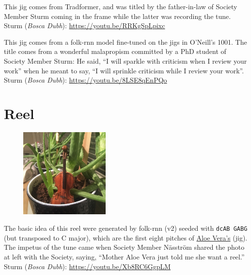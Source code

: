\documentclass[a4paper,notitlepage,twoside]{book}
\begin{document}
{}
\hypertarget{jig:Whataretheodds}{}
This jig comes from Tradformer,
and was titled by the father-in-law of Society Member Sturm
coming in the frame while the latter was recording the tune.
Sturm ({\em Bosca Dubh}): \url{https://youtu.be/RRKgSpLpixc}

{}
\hypertarget{jig:Sparkle}{}
This jig comes from a folk-rnn model fine-tuned on the jigs in O'Neill's 1001.
The title comes from a wonderful malapropism committed by
a PhD student of Society Member Sturm:
He said, ``I will sparkle with criticism when I review your work''
when he meant to say, ``I will sprinkle criticism while I review your work''.
Sturm ({\em Bosca Dubh}): \url{https://youtu.be/8LSE8qEnPQo}


\clearpage
\section{Reel}
{}  
\hypertarget{reel:AloeVeras}{}
\begin{figure}
\vspace{-0.3in}
\includegraphics[width=0.4\textwidth]{AloeVera2.jpg}
\end{figure}
The basic idea of this reel were generated by folk-rnn (v2) 
seeded with {\tt dcAB GABG} (but transposed to C major), 
which are the first eight pitches of \hyperlink{jig:AloeVeras}{Aloe Vera's} (jig).
The impetus of the tune came when Society Member Näsström shared the photo at left with the Society,
saying, ``Mother Aloe Vera just told me she want a reel.''
Sturm ({\em Bosca Dubh}): \url{https://youtu.be/Xb8RC6GgpLM}
\end{document}
